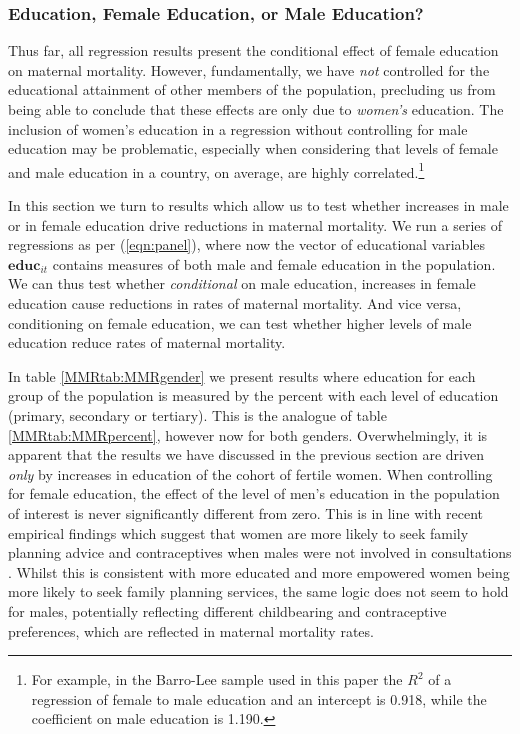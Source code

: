 \documentclass{article}[12pt,subeqn]
\begin{document}
\begin{spacing}{1.4}
\subsubsection{Education, Female Education, or Male Education?}
\label{ssscn:gender}
Thus far, all regression results present the conditional effect of female 
education on maternal mortality.  However, fundamentally, we have \emph{not} 
controlled for the educational attainment of other members of the population, 
precluding us from being able to conclude that these effects are only due to 
\emph{women's} education.  The inclusion of women's education in a regression 
without controlling for male education may be problematic, especially when 
considering that levels of female and male education in a country, on average, 
are highly correlated.\footnote{For example, in the Barro-Lee sample used in this 
paper the $R^2$ of a regression of female to male education and an intercept is 
0.918, while the coefficient on male education is 1.190.}

In this section we turn to results which allow us to test whether increases 
in male or in female education drive reductions in maternal mortality.  We
run a series of regressions as per (\ref{eqn:panel}), where now the vector
of educational variables $\mathbf{educ}_{it}$ contains measures of both male
and female education in the population.  We can thus test whether 
\emph{conditional} on male education, increases in female education cause
reductions in rates of maternal mortality.  And vice versa, conditioning on
female education, we can test whether higher levels of male education reduce
rates of maternal mortality.

In table \ref{MMRtab:MMRgender} we present results where education for each 
group of the population is measured by the percent with each level of 
education (primary, secondary or tertiary).  This is the analogue of table
\ref{MMRtab:MMRpercent}, however now for both genders.  Overwhelmingly, it is
apparent that the results we have discussed in the previous section are driven
\emph{only} by increases in education of the cohort of fertile women.  When
controlling for female education, the effect of the level of men's education in
the population of interest is never significantly different from
zero.  This is in line with recent empirical findings which suggest
that women are more likely to seek family planning advice and
contraceptives when males were not involved in consultations
\citet{Ashrafetal2014}.  Whilst this is consistent with more educated
and more empowered women being more likely to seek family planning
services, the same logic does not seem to hold for males, potentially
reflecting different childbearing and contraceptive preferences,
which are reflected in maternal mortality rates.


\end{spacing}
\end{document}
